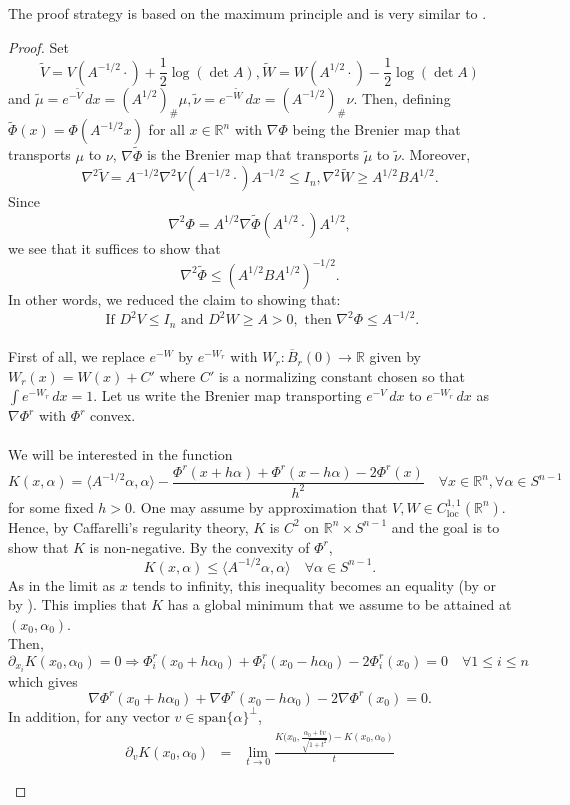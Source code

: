 \documentclass[11pt,a4paper,reqno]{amsart}
\numberwithin{equation}{section}
\theoremstyle{definition}
\newcommand{\ds}{\displaystyle}
\renewcommand{\tilde}{\widetilde}
\newcommand{\<}{\ensuremath \leq}
\renewcommand{\>}{\ensuremath \geq}
\renewcommand{\tilde}{\widetilde}
\begin{document}
The proof strategy is based on the maximum principle and is very similar to \cite{Vald1}. 

\begin{proof}
    Set $$\tilde V=V(A^{-1/2}\cdot)+\frac{1}{2}\log(\det A), \tilde W=W(A^{1/2}\cdot)-\frac{1}{2}\log(\det A)$$ and $\tilde \mu=e^{-\tilde V}\, dx=(A^{1/2})_{\#}\mu, \tilde \nu=e^{-\tilde W}\, dx=(A^{-1/2})_{\#}\nu$.  Then, defining $\tilde \Phi(x)=\Phi(A^{-1/2}x)$ for all $x \in \mathbb{R}^n$ with $\nabla \Phi$ being the Brenier map that transports $\mu$ to $\nu$, $\nabla \tilde \Phi$ is the Brenier map that transports $\tilde \mu$ to $\tilde \nu$. Moreover, $$\nabla^2 \tilde V= A^{-1/2}\nabla^2 V(A^{-1/2}\cdot)A^{-1/2} \leq I_n, \nabla^2 \tilde W \geq A^{1/2}BA^{1/2}.$$ Since $$\nabla^2 \Phi=A^{1/2}\nabla \tilde \Phi(A^{1/2}\cdot)A^{1/2},$$ we see that it suffices to show that $$\nabla^2 \tilde \Phi \leq (A^{1/2}BA^{1/2})^{-1/2}.$$ In other words, we reduced the claim to showing that: $$\text{ If } D^2V \leq I_n \text{ and } D^2W \geq A>0, \text{ then } \nabla^2 \Phi \leq A^{-1/2}.$$ 
    \hfill \\ First of all, we replace $e^{-W}$ by $e^{-W_r}$ with $W_r: \overline{B}_r(0) \rightarrow \mathbb{R}$ given by $W_r(x)=W(x)+C'$ where $C'$ is a normalizing constant chosen so that $\int e^{-W_r}\, dx=1.$ Let us write the Brenier map transporting $e^{-V}\, dx$ to $e^{-W_r}\, dx$  as $\nabla \Phi^r$ with $\Phi^r$ convex.
    \hfill \\ \\ We will be interested in the function $$K(x,\alpha)=\langle A^{-1/2}\alpha, \alpha \rangle-\frac{\Phi^r(x+h\alpha)+\Phi^r(x-h\alpha)-2\Phi^r(x)}{h^2} \quad \forall x \in \mathbb{R}^n, \forall \alpha \in S^{n-1}$$ for some fixed $h>0.$ One may assume by approximation that $V,W \in C^{1,1}_{\mathrm{loc}}(\mathbb{R}^n).$ Hence, by Caffarelli's regularity theory, $K$ is $C^2$ on $\mathbb{R}^n \times S^{n-1}$ and the goal is to show that $K$ is non-negative. 
    By the convexity of $\Phi^r$, $$K(x,\alpha) \leq \langle A^{-1/2}\alpha,\alpha\rangle \quad \forall \alpha \in S^{n-1}.$$ As in the limit as $x$ tends to infinity, this inequality becomes an equality (by \cite[Lemma 2.1]{Vald1} or by \cite[Lemma 3.1]{Alessio}). This implies that $K$ has a global minimum that we assume to be attained at $(x_0,
    \alpha_0)$. \\ Then, $$\partial_{x_i}K(x_0,\alpha_0)=0 \Longrightarrow \Phi_i^r(x_0+h\alpha_0)+\Phi_i^r(x_0-h\alpha_0)-2\Phi_i^r(x_0)=0 \quad \forall 1 \leq i \leq n$$ which gives $$\nabla \Phi^r(x_0+h\alpha_0)+\nabla \Phi^r(x_0-h\alpha_0)-2\nabla \Phi^r(x_0)=0.$$ In addition, for any vector $v \in \mathrm{span}\{\alpha\}^{\perp}$, $$\begin{array}{lll}\partial_{v}K(x_0,\alpha_0) &=& \ds \lim_{t \rightarrow 0}\frac{K \bigl(x_0,\frac{\alpha_0+tv}{\sqrt{1+t^2}} \bigl)-K(x_0,\alpha_0)}{t} \\ \\

\end{array}$$
\end{proof}
\end{document}
